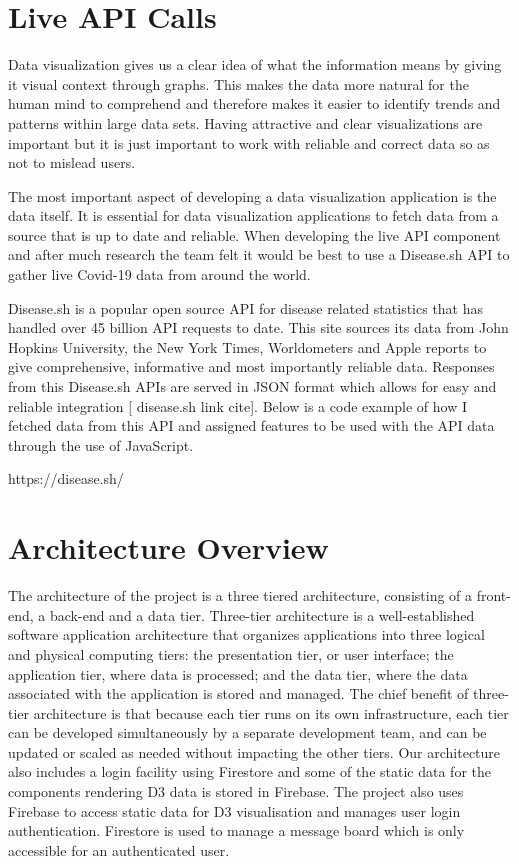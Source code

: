 \section{Live API Calls}
Data visualization gives us a clear idea of what the information means by giving it visual context through graphs. This makes the data more natural for the human mind to comprehend and therefore makes it easier to identify trends and patterns within large data sets. Having attractive and clear visualizations are important but it is just important to work with reliable and correct data so as not to mislead users.

The most important aspect of developing a data visualization application is the data itself. It is essential for data visualization applications to fetch data from a source that is up to date and reliable. When developing the live API component and after much research the team felt it would be best to use a Disease.sh API to gather live Covid-19 data from around the world.

Disease.sh is a popular open source API for disease related statistics that has handled over 45 billion API requests to date. This site sources its data from John Hopkins University, the New York Times, Worldometers and Apple reports to give comprehensive, informative and most importantly reliable data. Responses from this Disease.sh APIs are served in JSON format which allows for easy and reliable integration [ disease.sh link cite]. Below is a code example of how I fetched data from this API and assigned features to be used with the API data through the use of JavaScript.

https://disease.sh/ 


\section{Architecture Overview}
The architecture of the project is a three tiered architecture, consisting of a front-end, a back-end and a data tier.
Three-tier architecture is a well-established software application architecture that organizes applications into three logical and physical computing tiers: the presentation tier, or user interface; the application tier, where data is processed; and the data tier, where the data associated with the application is stored and managed.
The chief benefit of three-tier architecture is that because each tier runs on its own infrastructure, each tier can be developed simultaneously by a separate development team, and can be updated or scaled as needed without impacting the other tiers.\cite{architecture}
Our architecture also includes a login facility using Firestore and some of the static data for the components rendering D3 data is stored in Firebase.
The project also uses Firebase to access static data for D3 visualisation and manages user login authentication. Firestore is used to manage a message board which is only accessible for an authenticated user.


